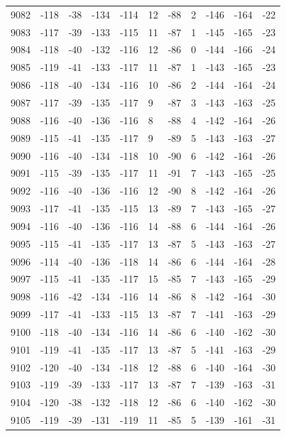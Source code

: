 \begin{table}[H]
\begin{tabular}{lllllllllll}
9082 & -118 & -38 & -134 & -114 & 12 & -88 & 2 & -146 & -164 & -22 \\
9083 & -117 & -39 & -133 & -115 & 11 & -87 & 1 & -145 & -165 & -23 \\
9084 & -118 & -40 & -132 & -116 & 12 & -86 & 0 & -144 & -166 & -24 \\
9085 & -119 & -41 & -133 & -117 & 11 & -87 & 1 & -143 & -165 & -23 \\
9086 & -118 & -40 & -134 & -116 & 10 & -86 & 2 & -144 & -164 & -24 \\
9087 & -117 & -39 & -135 & -117 & 9 & -87 & 3 & -143 & -163 & -25 \\
9088 & -116 & -40 & -136 & -116 & 8 & -88 & 4 & -142 & -164 & -26 \\
9089 & -115 & -41 & -135 & -117 & 9 & -89 & 5 & -143 & -163 & -27 \\
9090 & -116 & -40 & -134 & -118 & 10 & -90 & 6 & -142 & -164 & -26 \\
9091 & -115 & -39 & -135 & -117 & 11 & -91 & 7 & -143 & -165 & -25 \\
9092 & -116 & -40 & -136 & -116 & 12 & -90 & 8 & -142 & -164 & -26 \\
9093 & -117 & -41 & -135 & -115 & 13 & -89 & 7 & -143 & -165 & -27 \\
9094 & -116 & -40 & -136 & -116 & 14 & -88 & 6 & -144 & -164 & -26 \\
9095 & -115 & -41 & -135 & -117 & 13 & -87 & 5 & -143 & -163 & -27 \\
9096 & -114 & -40 & -136 & -118 & 14 & -86 & 6 & -144 & -164 & -28 \\
9097 & -115 & -41 & -135 & -117 & 15 & -85 & 7 & -143 & -165 & -29 \\
9098 & -116 & -42 & -134 & -116 & 14 & -86 & 8 & -142 & -164 & -30 \\
9099 & -117 & -41 & -133 & -115 & 13 & -87 & 7 & -141 & -163 & -29 \\
9100 & -118 & -40 & -134 & -116 & 14 & -86 & 6 & -140 & -162 & -30 \\
9101 & -119 & -41 & -135 & -117 & 13 & -87 & 5 & -141 & -163 & -29 \\
9102 & -120 & -40 & -134 & -118 & 12 & -88 & 6 & -140 & -164 & -30 \\
9103 & -119 & -39 & -133 & -117 & 13 & -87 & 7 & -139 & -163 & -31 \\
9104 & -120 & -38 & -132 & -118 & 12 & -86 & 6 & -140 & -162 & -30 \\
9105 & -119 & -39 & -131 & -119 & 11 & -85 & 5 & -139 & -161 & -31 \\

\end{tabular}
\end{table}
